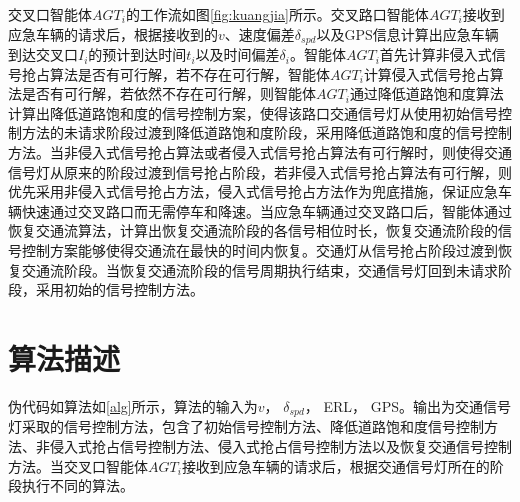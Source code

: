 
交叉口智能体${AGT_i}$的工作流如图\ref{fig:kuangjia}所示。交叉路口智能体${AGT_i}$接收到应急车辆的请求后，根据接收到的${v}$、速度偏差${\delta_{spd}}$以及GPS信息计算出应急车辆到达交叉口${I_i}$的预计到达时间${t_i}$以及时间偏差${\delta_{i}}$。智能体${AGT_i}$首先计算非侵入式信号抢占算法是否有可行解，若不存在可行解，智能体${AGT_i}$计算侵入式信号抢占算法是否有可行解，若依然不存在可行解，则智能体${AGT_i}$通过降低道路饱和度算法计算出降低道路饱和度的信号控制方案，使得该路口交通信号灯从使用初始信号控制方法的未请求阶段过渡到降低道路饱和度阶段，采用降低道路饱和度的信号控制方法。当非侵入式信号抢占算法或者侵入式信号抢占算法有可行解时，则使得交通信号灯从原来的阶段过渡到信号抢占阶段，若非侵入式信号抢占算法有可行解，则优先采用非侵入式信号抢占方法，侵入式信号抢占方法作为兜底措施，保证应急车辆快速通过交叉路口而无需停车和降速。当应急车辆通过交叉路口后，智能体通过恢复交通流算法，计算出恢复交通流阶段的各信号相位时长，恢复交通流阶段的信号控制方案能够使得交通流在最快的时间内恢复。交通灯从信号抢占阶段过渡到恢复交通流阶段。当恢复交通流阶段的信号周期执行结束，交通信号灯回到未请求阶段，采用初始的信号控制方法。



\section{算法描述}
伪代码如算法如\ref{alg}所示，算法的输入为${v}$， ${\delta_{spd}}$， ERL， GPS。输出为交通信号灯采取的信号控制方法，包含了初始信号控制方法、降低道路饱和度信号控制方法、非侵入式抢占信号控制方法、侵入式抢占信号控制方法以及恢复交通信号控制方法。当交叉口智能体${AGT_i}$接收到应急车辆的请求后，根据交通信号灯所在的阶段执行不同的算法。

